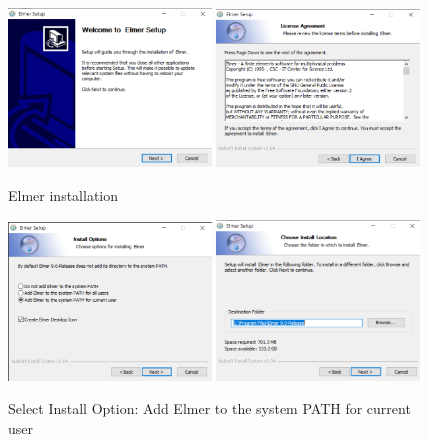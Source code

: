 \begin{figure}[H]
\begin{center}
\includegraphics[width=0.48\textwidth]{installer-3}
\includegraphics[width=0.48\textwidth]{installer-4}
\caption{Elmer installation}\label{fg:installer-3}
\end{center}
\end{figure}

\begin{figure}[H]
\begin{center}
\includegraphics[width=0.48\textwidth]{installer-5}
\includegraphics[width=0.48\textwidth]{installer-6}
\caption{Select Install Option: Add Elmer to the system PATH for current user}\label{fg:installer-5}
\end{center}
\end{figure}

